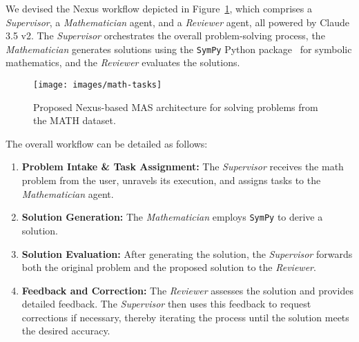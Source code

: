 We devised the Nexus workflow depicted in Figure~\ref{fig:math_arch}, which comprises a {\em Supervisor}, a {\em Mathematician} agent, and a {\em Reviewer} agent, all powered by Claude 3.5 v2. The {\em Supervisor} orchestrates the overall problem-solving process, the {\em Mathematician} generates solutions using the {\tt SymPy} Python package~\cite{meurer2017sympy} for symbolic mathematics, and the {\em Reviewer} evaluates the solutions.

\begin{figure}[h]
    \centering
    \texttt{[image: images/math-tasks]}
    \caption{Proposed Nexus-based MAS architecture for solving problems from the MATH dataset.}
    \label{fig:math_arch}
\end{figure}

The overall workflow can be detailed as follows:

\begin{enumerate}
\item \textbf{Problem Intake \& Task Assignment:} The {\em Supervisor} receives the math problem from the user, unravels its execution, and assigns tasks to the {\em Mathematician} agent.
\item \textbf{Solution Generation:} The {\em Mathematician} employs {\tt SymPy} to derive a solution.
\item \textbf{Solution Evaluation:} After generating the solution, the {\em Supervisor} forwards both the original problem and the proposed solution to the {\em Reviewer}.
\item \textbf{Feedback and Correction:} The {\em Reviewer} assesses the solution and provides detailed feedback. The {\em Supervisor} then uses this feedback to request corrections if necessary, thereby iterating the process until the solution meets the desired accuracy.
\end{enumerate}

